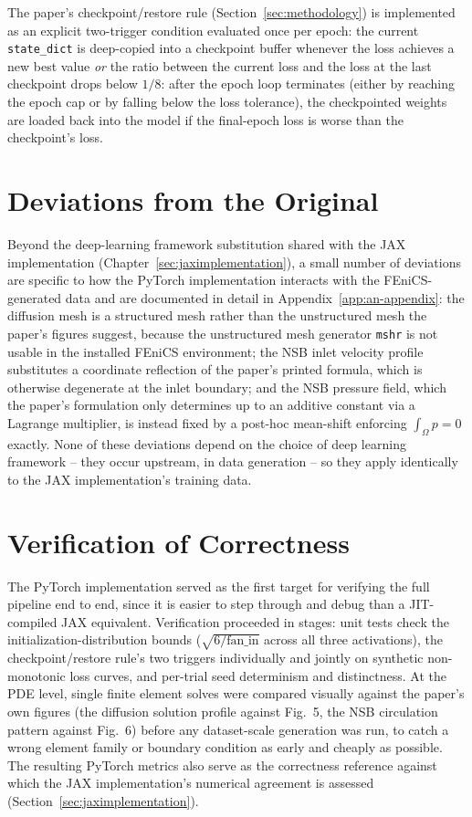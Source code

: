 The paper's checkpoint/restore rule (Section~\ref{sec:methodology}) is
implemented as an explicit two-trigger condition evaluated once per epoch:
the current \texttt{state\_dict} is deep-copied into a checkpoint buffer
whenever the loss achieves a new best value \emph{or} the ratio between the
current loss and the loss at the last checkpoint drops below $1/8$: after
the epoch loop terminates (either by reaching the epoch cap or by falling
below the loss tolerance), the checkpointed weights are loaded back into
the model if the final-epoch loss is worse than the checkpoint's loss.

\section{Deviations from the Original}

Beyond the deep-learning framework substitution shared with the JAX
implementation (Chapter~\ref{sec:jaximplementation}), a small number of
deviations are specific to how the PyTorch implementation interacts with
the FEniCS-generated data and are documented in detail in
Appendix~\ref{app:an-appendix}: the diffusion mesh is a structured mesh
rather than the unstructured mesh the paper's figures suggest, because the
unstructured mesh generator \texttt{mshr} is not usable in the installed
FEniCS environment; the NSB inlet velocity profile substitutes a
coordinate reflection of the paper's printed formula, which is otherwise
degenerate at the inlet boundary; and the NSB pressure field, which the
paper's formulation only determines up to an additive constant via a
Lagrange multiplier, is instead fixed by a post-hoc mean-shift enforcing
$\int_\Omega p = 0$ exactly. None of these deviations depend on the choice
of deep learning framework -- they occur upstream, in data generation --
so they apply identically to the JAX implementation's training data.

\section{Verification of Correctness}

The PyTorch implementation served as the first target for verifying the
full pipeline end to end, since it is easier to step through and debug
than a JIT-compiled JAX equivalent. Verification proceeded in stages:
unit tests check the initialization-distribution bounds
($\sqrt{6/\text{fan\_in}}$ across all three activations), the
checkpoint/restore rule's two triggers individually and jointly on
synthetic non-monotonic loss curves, and per-trial seed determinism and
distinctness. At the PDE level, single finite element solves were compared
visually against the paper's own figures (the diffusion solution profile
against Fig.~5, the NSB circulation pattern against Fig.~6) before any
dataset-scale generation was run, to catch a wrong element family or
boundary condition as early and cheaply as possible. The resulting PyTorch
metrics also serve as the correctness reference against which the JAX
implementation's numerical agreement is assessed
(Section~\ref{sec:jaximplementation}).
